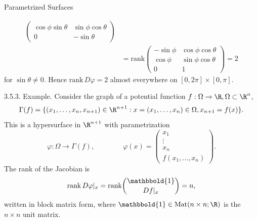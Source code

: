 \documentclass[smaller,hyperref={CJKbookmarks=true}]{beamer}
\begin{document}
\begin{frame}{Parametrized Surfaces}
\begin{spacing}{0.85}
\begin{equation*}
\begin{split}
\begin{pmatrix}
                    \cos\phi\sin\theta & \sin\phi\cos\theta \\
                    0 & -\sin\theta
                  \end{pmatrix} \\
       &=\text{rank}\begin{pmatrix}
                    -\sin\phi & \cos\phi\cos\theta \\
                    \cos\phi & \sin\phi\cos\theta \\
                    0 & 1
                  \end{pmatrix}=2
  \end{split}
\end{equation*}
for $\sin\theta\neq0$. Hence $\text{rank}\,D\varphi=2$ almost everywhere on $[0,2\pi]\times[0,\pi]$.
\end{spacing}
\newpage
\begin{spacing}{0.9}
\alert{3.5.3. Example.} Consider the graph of a potential function $f:\Omega\to\R,\Omega\subset\R^n$,
\[\Gamma(f)=\{(x_1,\ldots,x_n,x_{n+1})\in\R^{n+1}
:x=(x_1,\ldots,x_n)\in\Omega,x_{n+1}=f(x)\}.\]
This is a hypersurface in $\R^{n+1}$ with parametrization
\[\varphi:\Omega\to\Gamma(f),\qquad\qquad
\varphi(x)=\begin{pmatrix}
             x_1 \\
             \vdots \\
             x_n \\
             f(x_1,\ldots,x_n)
           \end{pmatrix}.\]
The rank of the Jacobian is
\[\text{rank}\,D\varphi|_x=\text{rank}\binom{\mathbbold{1}}{Df|_x}=n,\]
written in block matrix form, where $\mathbbold{1}\in\text{Mat}(n\times n;\R)$ is the $n\times n$ unit matrix.
\end{spacing}
\end{frame}
\end{document}
